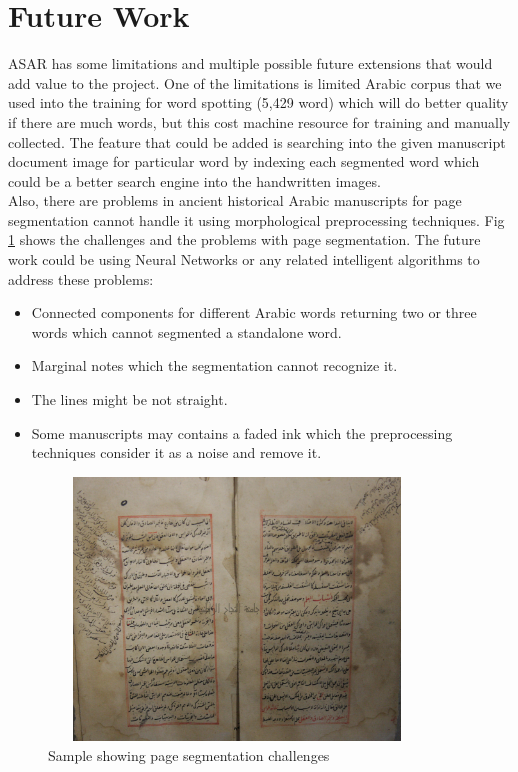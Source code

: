 \section{Future Work}
ASAR has some limitations and multiple possible future extensions that would add value to the project. One of the limitations is limited Arabic corpus that we used into the training for word spotting (5,429 word) which will do better quality if there are much words, but this cost machine resource for training and manually collected. The feature that could be added is searching into the given manuscript document image for particular word by indexing each segmented word which could be a better search engine into the handwritten images. \\

Also, there are problems in ancient historical Arabic manuscripts for page segmentation cannot handle it using morphological preprocessing techniques. Fig \ref{fig:page-chanllenges} shows the challenges and the problems with page segmentation. The future work could be using Neural Networks or any related intelligent algorithms to address these problems:

\begin{itemize}[itemsep=1pt, topsep=5pt]
    \item Connected components for different Arabic words returning two or three words which cannot segmented a standalone word.
    \item Marginal notes which the segmentation cannot recognize it.
    \item The lines might be not straight. 
    \item Some manuscripts may contains a faded ink which the preprocessing techniques consider it as a noise and remove it.
\end{itemize}

\begin{figure}[!htb]
    \centering
    \includegraphics[width=10cm,height=7cm]{images/page-seg-challenges.png}
    \caption{Sample showing page segmentation challenges}
    \label{fig:page-chanllenges}
\end{figure}

\newpage

\printbibliography
